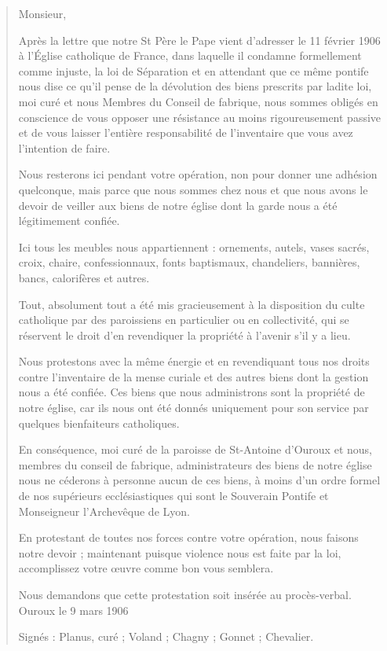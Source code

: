 \begin{quote}
Monsieur,

Après la lettre que notre St Père le Pape vient d'adresser le 11 février 1906 à l'Église catholique de France, dans laquelle il condamne formellement comme injuste, la loi de Séparation et en attendant que ce même pontife nous dise ce qu'il pense de la dévolution des biens prescrits par ladite loi, moi curé et nous Membres du Conseil
de fabrique, nous sommes obligés en conscience de vous opposer une résistance au moins rigoureusement passive et de vous laisser l'entière responsabilité de l'inventaire que vous avez l'intention de faire.

Nous resterons ici pendant votre opération, non pour donner une adhésion quelconque, mais parce que nous sommes chez nous et que nous avons le devoir de veiller aux biens de notre église dont la garde nous a été légitimement confiée.

Ici tous les meubles nous appartiennent : ornements, autels, vases sacrés, croix, chaire, confessionnaux, fonts baptismaux, chandeliers, bannières, bancs, calorifères et autres.

Tout, absolument tout a été mis gracieusement à la disposition du culte catholique par des paroissiens en particulier ou en collectivité, qui se réservent le droit d'en revendiquer la propriété à l'avenir s'il y a lieu.

Nous protestons avec la même énergie et en revendiquant tous nos droits contre l'inventaire de la mense curiale et des autres biens dont la gestion nous a été confiée. Ces biens que nous administrons sont la propriété de notre église, car ils nous ont été donnés uniquement pour son service par quelques bienfaiteurs catholiques.

En conséquence, moi curé de la paroisse de St-Antoine d'Ouroux et nous, membres du conseil de fabrique, administrateurs des biens de notre église nous ne céderons à personne aucun de ces biens, à moins d'un ordre formel de nos supérieurs ecclésiastiques qui sont le Souverain Pontife et Monseigneur l'Archevêque de Lyon.

En protestant de toutes nos forces contre votre opération, nous faisons notre devoir ; maintenant puisque violence nous est faite par la loi, accomplissez votre œuvre comme bon vous semblera.

Nous demandons que cette protestation soit insérée au procès-verbal. Ouroux le 9 mars 1906

Signés : Planus, curé ; Voland ; Chagny ; Gonnet ; Chevalier.
\end{quote}


